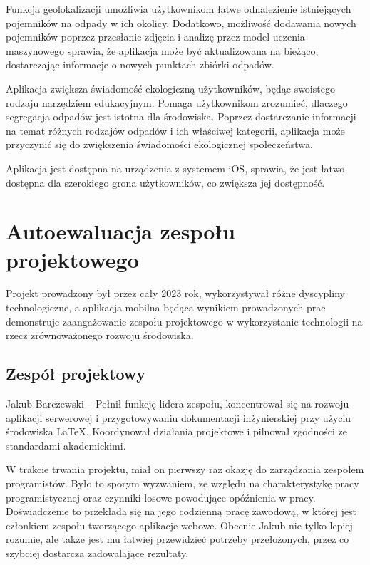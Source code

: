 \documentclass[12pt, a4paper, twoside, openany]{book}
\newcommand{\forceindent}{\leavevmode{\parindent=1.3em\indent}}
\begin{document}
{Funkcja geolokalizacji umożliwia użytkownikom łatwe odnalezienie istniejących pojemników na odpady w ich okolicy.
Dodatkowo, możliwość dodawania nowych pojemników poprzez przesłanie zdjęcia i analizę przez model uczenia maszynowego sprawia, że aplikacja może być aktualizowana na bieżąco, dostarczając informacje o nowych punktach zbiórki odpadów.

Aplikacja zwiększa świadomość ekologiczną użytkowników, będąc swoistego rodzaju narzędziem edukacyjnym. Pomaga użytkownikom zrozumieć, dlaczego segregacja odpadów jest istotna dla środowiska.
Poprzez dostarczanie informacji na temat różnych rodzajów odpadów i ich właściwej kategorii, aplikacja może przyczynić się do zwiększenia świadomości ekologicznej społeczeństwa.

Aplikacja jest dostępna na urządzenia z systemem iOS, sprawia, że jest łatwo dostępna dla szerokiego grona użytkowników, co zwiększa jej dostępność.

\section{Autoewaluacja zespołu projektowego}

\forceindent Projekt prowadzony był przez cały 2023 rok, wykorzystywał różne dyscypliny technologiczne, a aplikacja mobilna będąca wynikiem prowadzonych prac demonstruje zaangażowanie zespołu projektowego w wykorzystanie technologii na rzecz zrównoważonego rozwoju środowiska.

\subsection{Zespół projektowy}
\forceindent Jakub Barczewski -- Pełnił funkcję lidera zespołu, koncentrował się na rozwoju aplikacji serwerowej i przygotowywaniu dokumentacji inżynierskiej przy użyciu środowiska LaTeX. Koordynował działania projektowe i pilnował zgodności ze standardami akademickimi.

W trakcie trwania projektu, miał on pierwszy raz okazję do zarządzania zespołem programistów. 
Było to sporym wyzwaniem, ze względu na charakterystykę pracy programistycznej oraz czynniki losowe powodujące opóźnienia w pracy.
Doświadczenie to przekłada się na jego codzienną pracę zawodową, w której jest członkiem zespołu tworzącego aplikacje webowe. Obecnie Jakub nie tylko lepiej rozumie, ale także jest mu łatwiej przewidzieć potrzeby przełożonych, przez co szybciej dostarcza zadowalające rezultaty.

}
\end{document}
